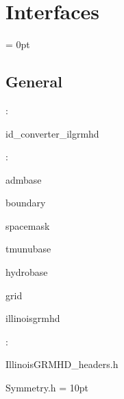 
\section{Interfaces} 


\parskip = 0pt

\vspace{3mm} \subsection*{General}

: 

id\_converter\_ilgrmhd
\vspace{2mm}

: 

admbase

boundary

spacemask

tmunubase

hydrobase

grid

illinoisgrmhd
\vspace{2mm}

\vspace{5mm}

: 

IllinoisGRMHD\_headers.h

Symmetry.h
\vspace{2mm}\parskip = 10pt 
